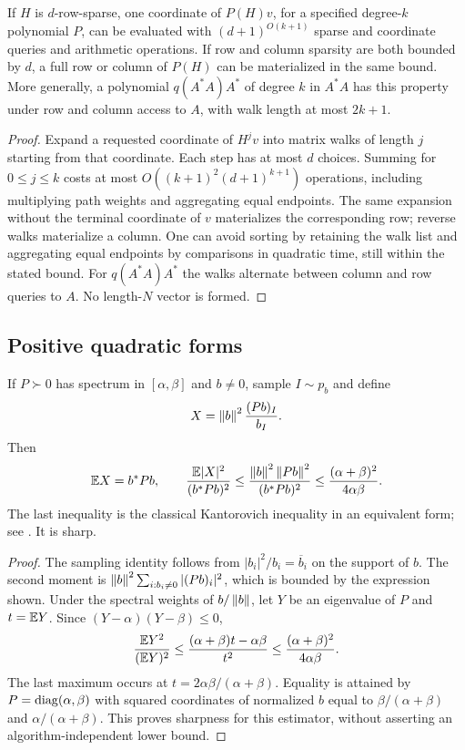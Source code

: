\begin{lemma}\label{lem:local}
If $H$ is $d$-row-sparse, one coordinate of $P(H)v$, for a specified
degree-$k$ polynomial $P$, can be evaluated with
$(d+1)^{O(k+1)}$ sparse and coordinate queries and arithmetic operations.
If row and column sparsity are both bounded by $d$, a full row or column of
$P(H)$ can be materialized in the same bound. More generally, a polynomial
$q(A^*A)A^*$ of degree $k$ in $A^*A$ has this property under row and column
access to $A$, with walk length at most $2k+1$.
\end{lemma}
\begin{proof}
Expand a requested coordinate of $H^jv$ into matrix walks of length $j$
starting from that coordinate. Each step has at most $d$ choices. Summing
for $0\leq j\leq k$ costs at most
$O((k+1)^2(d+1)^{k+1})$ operations, including multiplying path weights and
aggregating equal endpoints. The same expansion without the terminal
coordinate of $v$ materializes the corresponding row; reverse walks
materialize a column. One can avoid sorting by retaining the walk list and
aggregating equal endpoints by comparisons in quadratic time, still within
the stated bound. For $q(A^*A)A^*$ the walks alternate between column and
row queries to $A$. No length-$N$ vector is formed.
\end{proof}

\subsection{Positive quadratic forms}
\begin{lemma}\label{lem:kantorovich}
If $P\succ0$ has spectrum in $[\alpha,\beta]$ and $b\ne0$, sample
$I\sim p_b$ and define
\begin{equation}\label{eq:estimator}
                    X=\left\lVert b\right\rVert^2\frac{(Pb)_I}{b_I}.
\end{equation}
Then
\begin{equation}\label{eq:second-moment}
 \mathbb E X=b^*Pb,\qquad
 \frac{\mathbb E|X|^2}{(b^*Pb)^2}
 \leq\frac{\left\lVert b\right\rVert^2\left\lVert Pb\right\rVert^2}{(b^*Pb)^2}
 \leq\frac{(\alpha+\beta)^2}{4\alpha\beta}.
\end{equation}
The last inequality is the classical Kantorovich inequality in an equivalent
form; see \citet[Eq.~(1.1)]{Lin2013}. It is sharp.
\end{lemma}
\begin{proof}
The sampling identity follows from $|b_i|^2/b_i=\overline b_i$ on the
support of $b$. The second moment is
$\left\lVert b\right\rVert^2\sum_{i:b_i\ne0}|(Pb)_i|^2$, which is bounded by the expression
shown. Under the spectral weights of $b/\left\lVert b\right\rVert$, let $Y$ be an eigenvalue
of $P$ and $t=\mathbb E Y$. Since
$(Y-\alpha)(Y-\beta)\leq0$,
\[
 \frac{\mathbb E Y^2}{(\mathbb E Y)^2}
 \leq\frac{(\alpha+\beta)t-\alpha\beta}{t^2}
 \leq\frac{(\alpha+\beta)^2}{4\alpha\beta}.
\]
The last maximum occurs at $t=2\alpha\beta/(\alpha+\beta)$.
Equality is attained by $P=\operatorname{diag}(\alpha,\beta)$ with squared coordinates
of normalized $b$ equal to $\beta/(\alpha+\beta)$ and
$\alpha/(\alpha+\beta)$. This proves sharpness for this estimator, without
asserting an algorithm-independent lower bound.
\end{proof}


